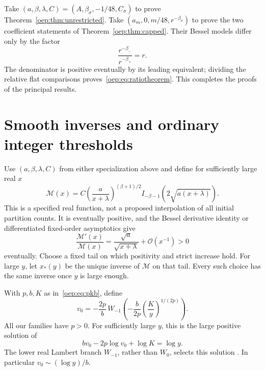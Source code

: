 \documentclass[11pt,letterpaper]{article}
\theoremstyle{remark}\newtheorem{remark}[theorem]{Remark}
\newcommand{\calM}{\mathcal M}
\newcommand{\OO}{\mathcal O}
\begin{document}
Take $(a,\beta,\lambda,C)=(A,\beta_\sigma,-1/48,C_\sigma)$ to prove Theorem~\ref{oep:thm:unrestricted}. Take $(a_m,0,m/48,r^{-\beta_\sigma})$ to prove the two coefficient statements of Theorem~\ref{oep:thm:capped}. Their Bessel models differ only by the factor
\[
 \frac{r^{-\beta_-}}{r^{-\beta_+}}=r.
\]
The denominator is positive eventually by its leading equivalent; dividing the relative flat comparisons proves~\eqref{oep:eq:ratiotheorem}. This completes the proofs of the principal results.

\section{Smooth inverses and ordinary integer thresholds}\label{oep:sec:inverse}
Use $(a,\beta,\lambda,C)$ from either specialization above and define for sufficiently large real $x$
\begin{equation}\label{oep:eq:smoothmodel}
 \calM(x)=C\left(\frac{a}{x+\lambda}\right)^{(\beta+1)/2}
                 I_{-\beta-1}(2\sqrt{a(x+\lambda)}).
\end{equation}
This is a specified real function, not a proposed interpolation of all initial partition counts. It is eventually positive, and the Bessel derivative identity or differentiated fixed-order asymptotics give
\begin{equation}\label{oep:eq:modelderivative}
 \frac{\calM'(x)}{\calM(x)}
 =\frac{\sqrt a}{\sqrt{x+\lambda}}+\OO(x^{-1})>0
\end{equation}
eventually. Choose a fixed tail on which positivity and strict increase hold. For large $y$, let $x_*(y)$ be the unique inverse of $\calM$ on that tail. Every such choice has the same inverse once $y$ is large enough.

With $p,b,K$ as in~\eqref{oep:eq:pkb}, define
\begin{equation}\label{oep:eq:v0}
 v_0=-\frac{2p}{b}\,
 W_{-1}\!\left(-\frac{b}{2p}\left(\frac Ky\right)^{1/(2p)}\right).
\end{equation}
All our families have $p>0$. For sufficiently large $y$, this is the large positive solution of
\begin{equation}\label{oep:eq:v0equation}
 bv_0-2p\log v_0+\log K=\log y.
\end{equation}
The lower real Lambert branch $W_{-1}$, rather than $W_0$, selects this solution \cite{lambert}. In particular $v_0\sim(\log y)/b$.
\end{document}
